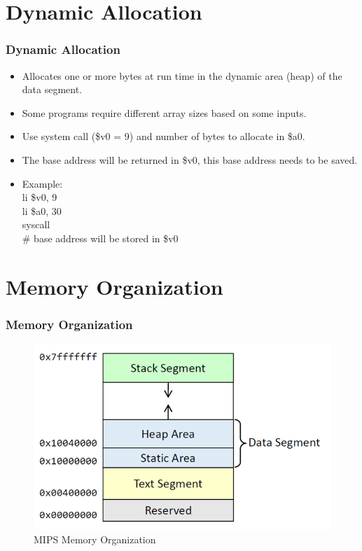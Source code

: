 \documentclass[
	10pt, %
	hmargin=1cm,vmargin=0cm,head=0.5cm,headsep=0pt,foot=0.5cm,margin=2cm
]{beamer}
\begin{document}
\section{Dynamic Allocation} 
\begin{frame}
	\frametitle{Dynamic Allocation}
	\begin{itemize}
		\item Allocates one or more bytes at run time in the dynamic area (heap) of the data segment.\pause
		\item Some programs require different array sizes based on some inputs. \pause
		\item Use system call (\color{red}\$v0\color{black}\hspace{0.05cm} = 9) and number of bytes to allocate in \color{red}\$a0\color{black}. \pause
		\item The base address will be returned in \color{red}\$v0\color{black}, this base address needs to be saved. \pause
		\item Example: \\
		\color{blue}li \color{red}\$v0\color{black}, 9 \\
		\color{blue}li \color{red}\$a0\color{black}, 30 \\ 
		\color{blue}syscall \color{black} \\ 
		\# base address will be stored in \$v0 \\ 
	\end{itemize}
\end{frame}

\section{Memory Organization}
\begin{frame}
	\frametitle{Memory Organization}
	\begin{figure}
		\includegraphics[width=0.5\linewidth]{mips_memory.png}
		\caption{MIPS Memory Organization}
	\end{figure}
\end{frame}
\end{document}
